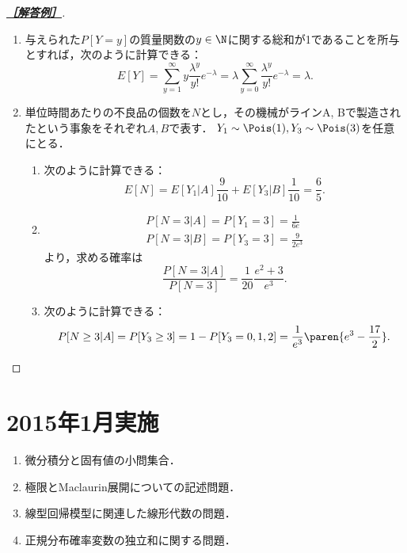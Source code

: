 \documentclass[uplatex,dvipdfmx]{jsarticle}
\begin{document}
\begin{proof}[\textbf{\underline{［解答例］}}]\mbox{}
    \begin{enumerate}
        \item 与えられた$P[Y=y]$の質量関数の$y\in\N$に関する総和が1であることを所与とすれば，次のように計算できる：
        \[E[Y]=\sum_{y=1}^\infty y\frac{\lambda^y}{y!}e^{-\lambda}=\lambda\sum_{y=0}^\infty\frac{\lambda^y}{y!}e^{-\lambda}=\lambda.\]
        \item 単位時間あたりの不良品の個数を$N$とし，その機械がラインA, Bで製造されたという事象をそれぞれ$A,B$で表す．
        $Y_1\sim\Pois(1),Y_3\sim\Pois(3)$を任意にとる．
        \begin{enumerate}
            \item 次のように計算できる：
            \[E[N]=E[Y_1|A]\frac{9}{10}+E[Y_3|B]\frac{1}{10}=\frac{6}{5}.\]
            \item \begin{align*}
                P[N=3|A]=P[Y_1=3]=\frac{1}{6e}\\
                P[N=3|B]=P[Y_3=3]=\frac{9}{2e^3}
            \end{align*}
            より，求める確率は
            \[\frac{P[N=3|A]}{P[N=3]}=\frac{1}{20}\frac{e^2+3}{e^3}.\]
            \item 次のように計算できる：
            \[P[N\ge 3|A]=P[Y_3\ge3]=1-P[Y_3=0,1,2]=\frac{1}{e^3}\paren{e^3-\frac{17}{2}}.\]
        \end{enumerate}
    \end{enumerate}
\end{proof}

\section{2015年1月実施}

\begin{tcolorbox}[colframe=ForestGreen, colback=ForestGreen!10!white,breakable,colbacktitle=ForestGreen!40!white,coltitle=black,fonttitle=\bfseries\sffamily,
    title=概観]
    \begin{enumerate}[{第}1{問}]
        \item 微分積分と固有値の小問集合．
        \item 極限とMaclaurin展開についての記述問題．
        \item 線型回帰模型に関連した線形代数の問題．
        \item 正規分布確率変数の独立和に関する問題．
    \end{enumerate}
\end{tcolorbox}
\end{document}
